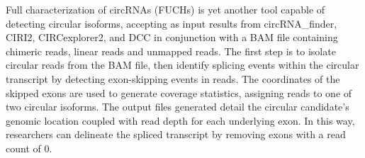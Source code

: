 Full characterization of circRNAs (FUCHs) \cite{FUCHS} is yet another tool capable of detecting circular isoforms, accepting as input results from  circRNA\_finder, CIRI2, CIRCexplorer2, and DCC in conjunction with a BAM file containing chimeric reads, linear reads and unmapped reads. The first step is to isolate circular reads from the BAM file, then identify splicing events within the circular transcript by detecting exon-skipping events in reads. The coordinates of the skipped exons are used to generate coverage statistics, assigning reads to one of two circular isoforms. The output files generated detail the circular candidate's genomic location coupled with read depth for each underlying exon. In this way, researchers can delineate the spliced transcript by removing exons with a read count of 0. \par

